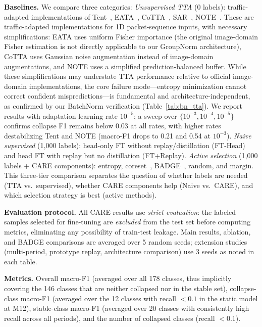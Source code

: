 \documentclass[journal]{IEEEtran}
\newcommand{\ours}{CARE}  %
\begin{document}
\textbf{Baselines.}
We compare three categories:
\textit{Unsupervised TTA} (0 labels): traffic-adapted implementations of Tent~\cite{wang2021tent}, EATA~\cite{niu2022eata}, CoTTA~\cite{wang2022cotta}, SAR~\cite{niu2023sar}, NOTE~\cite{gong2022note}.
These are traffic-adapted implementations for 1D packet-sequence inputs, with necessary simplifications: EATA uses uniform Fisher importance (the original image-domain Fisher estimation is not directly applicable to our GroupNorm architecture), CoTTA uses Gaussian noise augmentation instead of image-domain augmentations, and NOTE uses a simplified prediction-balanced buffer.
While these simplifications may understate TTA performance relative to official image-domain implementations, the core failure mode---entropy minimization cannot correct confident mispredictions---is fundamental and architecture-independent, as confirmed by our BatchNorm verification (Table~\ref{tab:bn_tta}).
We report results with adaptation learning rate $10^{-5}$; a sweep over $\{10^{-3}, 10^{-4}, 10^{-5}\}$ confirms collapse F1 remains below 0.03 at all rates, with higher rates destabilizing Tent and NOTE (macro-F1 drops to 0.21 and 0.54 at $10^{-3}$).
\textit{Naive supervised} (1{,}000 labels): head-only FT without replay/distillation (FT-Head) and head FT with replay but no distillation (FT+Replay).
\textit{Active selection} (1{,}000 labels + \ours{} components): entropy, coreset~\cite{sener2018coreset}, BADGE~\cite{ash2020badge}, random, and margin.
This three-tier comparison separates the question of whether labels are needed (TTA vs.\ supervised), whether \ours{} components help (Naive vs.\ \ours{}), and which selection strategy is best (active methods).

\textbf{Evaluation protocol.}
All \ours{} results use \textit{strict evaluation}: the labeled samples selected for fine-tuning are \textit{excluded} from the test set before computing metrics, eliminating any possibility of train-test leakage.
Main results, ablation, and BADGE comparisons are averaged over 5 random seeds; extension studies (multi-period, prototype replay, architecture comparison) use 3 seeds as noted in each table.

\textbf{Metrics.}
Overall macro-F1 (averaged over all 178 classes, thus implicitly covering the 146 classes that are neither collapsed nor in the stable set), collapse-class macro-F1 (averaged over the 12 classes with recall $<0.1$ in the static model at M12), stable-class macro-F1 (averaged over 20 classes with consistently high recall across all periods), and the number of collapsed classes (recall $< 0.1$).
\end{document}

